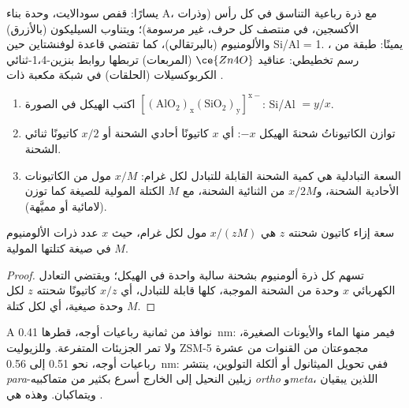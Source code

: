 \begin{omfigure}
{\small يسارًا: قفص سودالايت، وحدة بناء  A، مع
ذرة رباعية التناسق في كل رأس (وذرات الأكسجين، في منتصف كل حرف، غير
مرسومة)؛ ويتناوب السيليكون (بالأزرق) والألومنيوم (بالبرتقالي)، كما تقتضي قاعدة لوفنشتاين
حين Si/Al = 1. يمينًا: طبقة من ،
رسم تخطيطي: عناقيد $\ce{Zn4O}$ (المربعات) تربطها روابط بنزين-1،4-ثنائي الكربوكسيلات
(الحلقات) في شبكة مكعبة ذات .}
\end{omfigure}

\begin{method}\label{met:b3:inorganic-materials:zeolite-formula}
\begin{enumerate}
  \item اكتب الهيكل في الصورة $\mathrm{[(AlO_2)_x(SiO_2)_y]^{x-}}$: Si/Al $= y/x$.
  \item توازن الكاتيوناتُ شحنةَ الهيكل $-x$: أي $x$ كاتيونًا أحادي الشحنة أو $x/2$
        كاتيونًا ثنائي الشحنة.
  \item السعة التبادلية هي كمية الشحنة القابلة للتبادل لكل غرام:
        $x/M$ مول من الكاتيونات الأحادية الشحنة، و$x/2M$ من الثنائية الشحنة، مع $M$
        الكتلة المولية للصيغة كما توزن (لامائية أو مميَّهة).
\end{enumerate}
\end{method}

\begin{proposition}\label{prop:b3:inorganic-materials:exchange-capacity}
سعة  إزاء كاتيون شحنته $z$ هي $x/(zM)$ مول لكل غرام،
حيث $x$ عدد ذرات الألومنيوم في صيغة كتلتها المولية $M$.
\end{proposition}

\begin{proof}
تسهم كل ذرة ألومنيوم بشحنة سالبة واحدة في الهيكل؛ ويقتضي التعادل
الكهربائي $x$ وحدة من الشحنة الموجبة، كلها قابلة للتبادل، أي
$x/z$ كاتيونًا شحنته $z$ لكل وحدة صيغية، أي لكل كتلة $M$.
\end{proof}

 A نوافذ من ثمانية رباعيات أوجه، قطرها \qty{0.41}{nm}: فيمر منها الماء 
والأيونات الصغيرة، ولا تمر الجزيئات المتفرعة. وللزيوليت ZSM-5 مجموعتان من القنوات من عشرة
رباعيات أوجه، نحو 0.51 إلى \qty{0.56}{nm}: ففي تحويل الميثانول أو
ألكلة التولوين، ينتشر \textit{para}-زيلين النحيل إلى الخارج أسرع بكثير من
متماكبيه \textit{ortho} و\textit{meta}، اللذين يبقيان ويتماكبان. وهذه هي .

